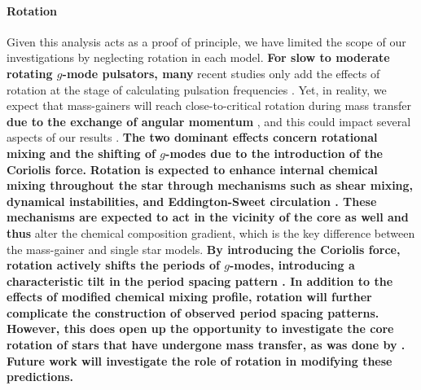 \documentclass[twocolumn, twocolappendix, oneside]{aastex631}
\newcommand{\gmode}{$g$-mode\xspace}
\newcommand{\gmodes}{$g$-modes\xspace}
\begin{document}
\paragraph{Rotation} Given this analysis acts as a proof of principle, we have limited the scope of our investigations by neglecting rotation in each model. {\bf For slow to moderate rotating \gmode pulsators, many} recent studies only add the effects of rotation at the stage of calculating pulsation frequencies \citep[e.g.][]{Michielsen+2021}. Yet, in reality, we expect that mass-gainers will reach close-to-critical rotation during mass transfer {\bf due to the exchange of angular momentum} \citep{Packet+1981, Paczynski+1991, Popham+1991, Renzo+2021}, and this could impact several aspects of our results \citep[e.g.][and references therein]{Aerts+2023:2023arXiv231108453A}. {\bf The two dominant effects concern rotational mixing and the shifting of \gmodes due to the introduction of the Coriolis force.} {\bf Rotation is expected to enhance internal chemical mixing throughout the star through mechanisms such as shear mixing, dynamical instabilities, and Eddington-Sweet circulation \citep{Maeder2000}. These mechanisms are expected to act in the vicinity of the core as well and thus} alter the chemical composition gradient, which is the key difference between the mass-gainer and single star models. {\bf By introducing the Coriolis force, rotation actively shifts the periods of \gmodes \citep{Townsend2003}, introducing a characteristic tilt in the period spacing pattern \citep{Bouabid+2013}. In addition to the effects of modified chemical mixing profile, rotation will further complicate the construction of observed period spacing patterns. However, this does open up the opportunity to investigate the core rotation of stars that have undergone mass transfer, as was done by \citet{Guo2019}.} {\bf Future work will investigate the role of rotation in modifying these predictions.}
\end{document}

